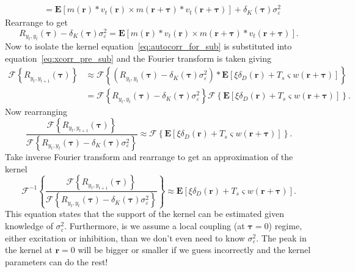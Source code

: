 \documentclass[review,authoryear,3p]{elsarticle}
\begin{document}
{\begin{align}
	&= \mathbf{E}\left[m(\mathbf{r}) \ast v_t(\mathbf{r}) \times m(\mathbf{r}+\boldsymbol{\tau}) \ast v_t(\mathbf{r}+\boldsymbol{\tau})\right] + \delta_K(\boldsymbol{\tau})\sigma_{\varepsilon}^2
\end{align}
Rearrange to get
\begin{equation}\label{eq:autocorr_for_sub}
	R_{y_{t},y_{t}}(\boldsymbol{\tau}) - \delta_K(\boldsymbol{\tau})\sigma_{\varepsilon}^2 = \mathbf{E}\left[m(\mathbf{r}) \ast v_t(\mathbf{r}) \times m(\mathbf{r}+\boldsymbol{\tau}) \ast v_t(\mathbf{r}+\boldsymbol{\tau})\right].
\end{equation}
Now to isolate the kernel equation~\ref{eq:autocorr_for_sub} is substituted into equation~\ref{eq:xcorr_pre_sub} and the Fourier transform is taken giving
\begin{align}
	\mathcal{F}\left\{R_{y_{t},y_{t+1}}(\boldsymbol{\tau})\right\} &\approx \mathcal{F}\left\{ \left(R_{y_t,y_t}(\boldsymbol{\tau}) - \delta_K\left(\boldsymbol{\tau}\right)\sigma_{\varepsilon}^2\right) \ast \mathbf{E} \left[ \xi\delta_D(\mathbf{r})  + T_s \varsigma w(\mathbf{r}+\boldsymbol{\tau}) \right] \right\} \\
	&= \mathcal{F}\left\{ R_{y_t,y_t}(\boldsymbol{\tau}) - \delta_K\left(\boldsymbol{\tau}\right) \sigma_{\varepsilon}^2 \right\} \mathcal{F}\left\{\mathbf{E}[ \xi \delta_D(\mathbf{r})  + T_s \varsigma w(\mathbf{r}+\boldsymbol{\tau}) ]\right\}.
\end{align}
Now rearranging
\begin{equation}
	\frac{\mathcal{F}\left\{R_{y_{t},y_{t+1}}(\boldsymbol{\tau})\right\}}{\mathcal{F}\left\{ R_{y_t,y_t}(\boldsymbol{\tau}) - \delta_K\left(\boldsymbol{\tau}\right)\sigma_{\varepsilon}^2 \right\}} \approx \mathcal{F}\left\{ \mathbf{E}\left[ \xi\delta_D\left(\mathbf{r}\right)  + T_s \varsigma w(\mathbf{r}+\boldsymbol{\tau}) \right]\right\}.
\end{equation}
Take inverse Fourier transform and rearrange to get an approximation of the kernel
\begin{equation}
	\mathcal{F}^{-1}\left\{\frac{\mathcal{F}\left\{R_{y_{t},y_{t+1}}(\boldsymbol{\tau})\right\}}{\mathcal{F}\left\{ R_{y_t,y_t}(\boldsymbol{\tau}) - \delta_K\left(\boldsymbol{\tau}\right)\sigma_{\varepsilon}^2 \right\}}\right\} \approx \mathbf{E}[\xi\delta_D\left(\mathbf{r}\right)  + T_s \varsigma w(\mathbf{r}+\boldsymbol{\tau})].
\end{equation}
This equation states that the support of the kernel can be estimated given knowledge of $\sigma_\varepsilon^2$. Furthermore, is we assume a local coupling (at $\boldsymbol\tau=0$) regime, either excitation or inhibition, than we don't even need to know $\sigma_\varepsilon^2$. The peak in the kernel at $\mathbf{r}=0$ will be bigger or smaller if we guess incorrectly and the kernel parameters can do the rest! }
\end{document}
